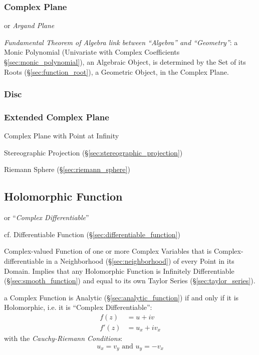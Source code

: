 \subsubsection{Complex Plane}\label{sec:complex_plane}

or \emph{Argand Plane}

\emph{Fundamental Theorem of Algebra link between ``Algebra'' and
  ``Geometry''}: a Monic Polynomial (Univariate with Complex Coefficients
\S\ref{sec:monic_polynomial}), an Algebraic Object, is determined by the Set of
its Roots (\S\ref{sec:function_root}), a Geometric Object, in the Complex
Plane.



\subsubsection{Disc}\label{sec:disc}

\subsubsection{Extended Complex Plane}\label{sec:extended_complex_plane}

Complex Plane with Point at Infinity

Stereographic Projection (\S\ref{sec:stereographic_projection})

Riemann Sphere (\S\ref{sec:riemann_sphere})



\subsection{Holomorphic Function}\label{sec:holomorphic_function}

or ``\emph{Complex Differentiable}''

cf. Differentiable Function (\S\ref{sec:differentiable_function})

Complex-valued Function of one or more Complex Variables that is
Complex-differentiable in a Neighborhood (\S\ref{sec:neighborhood}) of
every Point in its Domain. Implies that any Holomorphic Function is
Infinitely Differentiable (\S\ref{sec:smooth_function}) and equal to
its own Taylor Series (\S\ref{sec:taylor_series}).

a Complex Function is Analytic (\S\ref{sec:analytic_function}) if and only if
it is Holomorphic, i.e. it is ``Complex Differentiable'':
\begin{align*}
  f(z)  & = u + iv \\
  f'(z) & = u_x + iv_x
\end{align*}
with the \emph{Cauchy-Riemann Conditions}:
\[
  u_x = v_y \text{ and } u_y = - v_x
\]

